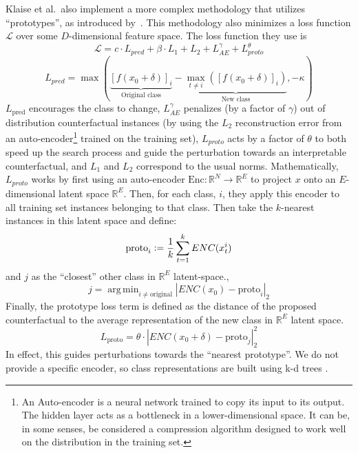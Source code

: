\documentclass{article}
\DeclareMathOperator*{\argmin}{arg\,min}
\newcommand{\defeq}{\vcentcolon=}
\begin{document}
Klaise et al.\ also implement a more complex methodology that utilizes ``prototypes'', as introduced by~\cite{van_looveren_conditional_2021}.
This methodology also minimizes a loss function \(\mathcal{L}\) over some \(D\)-dimensional feature space. The loss function they use is 
\begin{equation}
    \mathcal{L}=c \cdot L_{pred}+ \beta\cdot L_1+L_2+L_{AE}^\gamma+L_{proto}^\theta
\end{equation}
\begin{equation}
    L_{pred} = 
    \max \left( 
        \underbrace{
            \left[
                f(x_0 + \delta)
            \right]_i %
        }_{
            \text{Original class}
        }  - \underbrace{
            \max_{t\neq i} \left(
                \left[
                    f(x_0 + \delta)
                \right]_i %
            \right)
        }_{
            \text{New class}
        },
        -\kappa
    \right)
\end{equation}
\(L_\text{pred}\) encourages the class to change, \(L_{AE}^\gamma\) penalizes (by a factor of \(\gamma\)) out of distribution counterfactual instances (by using the \(L_2\) reconstruction error from an auto-encoder\footnote{An Auto-encoder is a neural network trained to copy its input to its output. The hidden layer acts as a bottleneck in a lower-dimensional space. It can be, in some senses, be considered a compression algorithm designed to work well on the distribution in the training set.} \citep{jordan_introduction_2018} 
trained on the training set), \(L_{proto}\) acts by a factor of \(\theta\) to both speed up the search process and guide the perturbation towards an interpretable counterfactual, and \(L_1\) and \(L_2\) correspond to the usual norms.
Mathematically, \(L_{proto}\) works by first using an auto-encoder \(\text{Enc}:\mathbb{R}^N\rightarrow \mathbb{R}^E\) to project \(x\) onto an \(E\)-dimensional latent space \(\mathbb{R}^E\). Then, for each class, \(i\), they apply this encoder to all training set instances belonging to that class. Then take the 
\(k
\)-nearest instances in this latent space and define:
\begin{equation}
    \text{proto}_i \defeq \frac{1}{k}  \sum_{t=1}^k ENC(x_t^i)
\end{equation}
and \(j\) as the ``closest'' other class in \(\mathbb{R}^E\) latent-space., 
\begin{equation}
    j = \argmin_{i\neq \text{original}}  \left| ENC \left( x_0 \right)- \text{proto}_i \right|_2
\end{equation}
Finally, the prototype loss term is defined as the distance of the proposed counterfactual to the average representation of the new class in \(\mathbb{R}^E\) latent space.
\begin{equation}
    L_{\text{proto}}  = \theta \cdot \left| ENC\left(x_0  + \delta \right) - \text{proto}_j \right| _2^2
\end{equation}
In effect, this guides perturbations towards the ``nearest prototype''.
We do not provide a specific encoder, so class representations are built using k-d trees \citep{bentley_multidimensional_1975}. 
\end{document}
